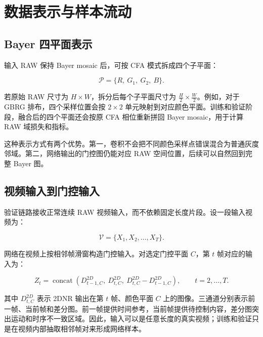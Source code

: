 \documentclass[UTF8,zihao=-4]{ctexart}
\begin{document}
\section{数据表示与样本流动}

\subsection{Bayer 四平面表示}

输入 RAW 保持 Bayer mosaic 后，可按 CFA 模式拆成四个子平面：

\[
\mathcal{P}=\{R,\ G_1,\ G_2,\ B\}.
\]

若原始 RAW 尺寸为 $H\times W$，拆分后每个子平面尺寸为 $\frac{H}{2}\times\frac{W}{2}$。例如，对于 GBRG 排布，四个采样位置会按 $2\times2$ 单元映射到对应颜色平面。训练和验证阶段，融合后的四个平面还会按原 CFA 相位重新拼回 Bayer mosaic，用于计算 RAW 域损失和指标。

这种表示方式有两个优势。第一，卷积不会把不同颜色采样点错误混合为普通灰度邻域。第二，网络输出的门控图仍能对应 RAW 空间位置，后续可以自然回到完整 Bayer 图。

\subsection{视频输入到门控输入}

验证链路接收正常连续 RAW 视频输入，而不依赖固定长度片段。设一段输入视频为：

\[
\mathcal{V}=\{X_1,X_2,\ldots,X_T\}.
\]

网络在视频上按相邻帧滑窗构造门控输入。对选定门控平面 $C$，第 $t$ 帧对应的输入为：

\[
Z_t=
\operatorname{concat}\left(
D^{2D}_{t-1,C},\
D^{2D}_{t,C},\
D^{2D}_{t,C}-D^{2D}_{t-1,C}
\right),
\qquad t=2,\ldots,T.
\]

其中 $D^{2D}_{t,C}$ 表示 2DNR 输出在第 $t$ 帧、颜色平面 $C$ 上的图像。三通道分别表示前一帧、当前帧和差分图。前一帧提供时间参考，当前帧提供待控制内容，差分图突出运动和时序不一致区域。因此，输入可以是任意长度的真实视频；训练和验证只是在视频内部抽取相邻帧对来形成网络样本。
\end{document}
